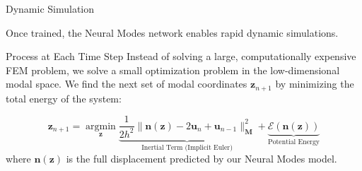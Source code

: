 \documentclass{beamer}
\DeclareMathOperator{\argmin}{argmin}
\begin{document}
\begin{frame}{Dynamic Simulation}
    
    Once trained, the Neural Modes network enables rapid dynamic simulations.
    
    \begin{block}{Process at Each Time Step}
        Instead of solving a large, computationally expensive FEM problem, we solve a small optimization problem in the low-dimensional modal space. We find the next set of modal coordinates \(\mathbf{z}_{n+1}\) by minimizing the total energy of the system:
        
        \begin{equation}
            \mathbf{z}_{n+1} = \underset{\mathbf{z}}{\argmin} \underbrace{\frac{1}{2h^2} \|\bm{n}(\mathbf{z}) - 2\bm{u}_n + \bm{u}_{n-1}\|_{\bm{M}}^2}_{\text{Inertial Term (Implicit Euler)}} + \underbrace{\mathcal{E}(\bm{n}(\mathbf{z}))}_{\text{Potential Energy}}
        \end{equation}
        where \(\bm{n}(\mathbf{z})\) is the full displacement predicted by our Neural Modes model.
    \end{block}
    
\end{frame}
\end{document}
